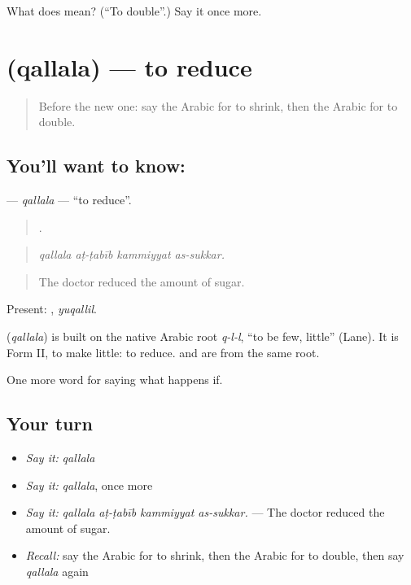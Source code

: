 \begin{tcolorbox}[breakable,colback=teal!4,colframe=teal!35!black,title={Before you move on}]
What does  mean? (\textquotedblleft{}To double\textquotedblright{}.) Say it once more.
\end{tcolorbox}
\section[\texorpdfstring{\ar{قلل} (qallala)}{قلل (qallala)}]{ (qallala) — to reduce}

\label{lesson:AR-C412-qallala}



\begin{quote}
Before the new one: say the Arabic for to shrink, then the Arabic for to double.
\end{quote}

\subsection*{You'll want to know: }
\textbf{} — \emph{qallala} — \textquotedblleft{}to reduce\textquotedblright{}.

\begin{quote}
   .
\end{quote}

\begin{quote}
\emph{qallala aṭ-ṭabīb kammiyyat as-sukkar.}
\end{quote}

\begin{quote}
The doctor reduced the amount of sugar.
\end{quote}

Present: , \emph{yuqallil}.

\begin{cousinweb}
\textbf{} (\emph{qallala}) is built on the native Arabic root \emph{q-l-l}, \textquotedblleft{}to be few, little\textquotedblright{} (Lane). It is Form II, to make little: to reduce.  and  are from the same root.
\end{cousinweb}

\begin{grammarlens}[title={What you've built}]
One more word for saying what happens if.
\end{grammarlens}

\subsection*{Your turn}
\begin{itemize}
\raggedright
  \item \emph{Say it:} \emph{qallala}
  \item \emph{Say it:} \emph{qallala}, once more
  \item \emph{Say it:} \emph{qallala aṭ-ṭabīb kammiyyat as-sukkar.} — The doctor reduced the amount of sugar.
  \item \emph{Recall:} say the Arabic for to shrink, then the Arabic for to double, then say \emph{qallala} again
\end{itemize}

